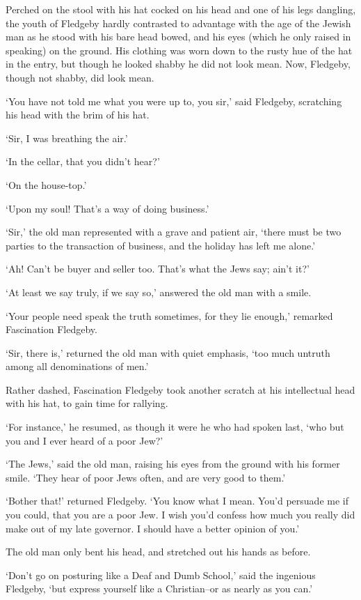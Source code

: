 Perched on the stool with his hat cocked on his head and one of his legs
dangling, the youth of Fledgeby hardly contrasted to advantage with the
age of the Jewish man as he stood with his bare head bowed, and his eyes
(which he only raised in speaking) on the ground. His clothing was worn
down to the rusty hue of the hat in the entry, but though he looked
shabby he did not look mean. Now, Fledgeby, though not shabby, did look
mean.

‘You have not told me what you were up to, you sir,’ said Fledgeby,
scratching his head with the brim of his hat.

‘Sir, I was breathing the air.’

‘In the cellar, that you didn’t hear?’

‘On the house-top.’

‘Upon my soul! That’s a way of doing business.’

‘Sir,’ the old man represented with a grave and patient air, ‘there must
be two parties to the transaction of business, and the holiday has left
me alone.’

‘Ah! Can’t be buyer and seller too. That’s what the Jews say; ain’t it?’

‘At least we say truly, if we say so,’ answered the old man with a
smile.

‘Your people need speak the truth sometimes, for they lie enough,’
remarked Fascination Fledgeby.

‘Sir, there is,’ returned the old man with quiet emphasis, ‘too much
untruth among all denominations of men.’

Rather dashed, Fascination Fledgeby took another scratch at his
intellectual head with his hat, to gain time for rallying.

‘For instance,’ he resumed, as though it were he who had spoken last,
‘who but you and I ever heard of a poor Jew?’

‘The Jews,’ said the old man, raising his eyes from the ground with his
former smile. ‘They hear of poor Jews often, and are very good to them.’

‘Bother that!’ returned Fledgeby. ‘You know what I mean. You’d persuade
me if you could, that you are a poor Jew. I wish you’d confess how much
you really did make out of my late governor. I should have a better
opinion of you.’

The old man only bent his head, and stretched out his hands as before.

‘Don’t go on posturing like a Deaf and Dumb School,’ said the ingenious
Fledgeby, ‘but express yourself like a Christian--or as nearly as you
can.’

